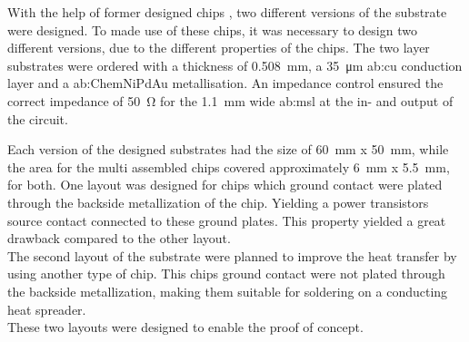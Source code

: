 With the help of former designed chips \cite{Maroldt2010}, two different versions of the substrate were designed.
To made use of these chips, it was necessary to design two different versions, due to the different properties of the chips.
The two layer substrates were ordered with a thickness of \SI{0.508}{\milli \metre}, a \SI{35}{\micro \metre} \gls{ab:cu} conduction layer and a \gls{ab:ChemNiPdAu} metallisation.
An impedance control ensured the correct impedance of \SI{50}{\ohm} for the \SI{1.1}{\milli \meter} wide \gls{ab:msl} at the in- and output of the circuit.


Each version of the designed substrates had the size of \SI{60}{\milli \meter} x \SI{50}{\milli \meter}, while the area for the multi assembled chips covered approximately \SI{6}{\milli \meter} x \SI{5.5}{\milli \meter}, for both.
One layout was designed for chips which ground contact were plated through the backside metallization of the chip.
Yielding a power transistors source contact connected to these ground plates.
This property yielded a great drawback compared to the other layout.\\
The second layout of the substrate were planned to improve the heat transfer by using another type of chip.
This chips ground contact were not plated through the backside metallization, making them suitable for soldering on a conducting heat spreader.\\
These two layouts were designed to enable the proof of concept.


